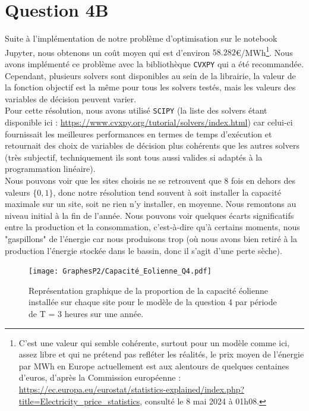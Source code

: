 \documentclass{article}
\begin{document}
\section*{Question 4B}
Suite à l'implémentation de notre problème d'optimisation sur le notebook Jupyter, nous obtenons 
un coût moyen qui est d'environ $\mathbf{58.282}$\euro/MWh\footnote{C'est une valeur qui semble cohérente, surtout pour un modèle comme ici, 
assez libre et qui ne prétend pas refléter les réalités, le prix moyen de l'énergie par MWh en Europe actuellement 
est aux alentours de quelques centaines d'euros, d'après la Commission européenne : 
\url{https://ec.europa.eu/eurostat/statistics-explained/index.php?title=Electricity_price_statistics}, 
consulté le 8 mai 2024 à 01h08.}.
Nous avons implémenté ce problème avec la bibliothèque \verb|CVXPY| qui a été recommandée. Cependant, plusieurs solvers sont disponibles au sein de la librairie, la valeur de la fonction objectif est la même pour tous les solvers testés, mais les valeurs des variables de décision peuvent varier.\\
Pour cette résolution, nous avons utilisé \verb|SCIPY| (la liste des solvers étant disponible ici : \url{https://www.cvxpy.org/tutorial/solvers/index.html})
car celui-ci fournissait les meilleures performances en termes de temps d'exécution et retournait des choix de variables de décision plus cohérents que les autres solvers 
(très subjectif, techniquement ils sont tous aussi valides si adaptés à la programmation linéaire). \\
Nous pouvons voir que les sites choisis ne se retrouvent que 8 fois en dehors des valeurs $\{0,1\}$, donc notre résolution
tend souvent à soit installer la capacité maximale sur un site, soit ne rien n'y installer, en moyenne.
Nous remontons au niveau initial à la fin de l'année. Nous pouvons voir quelques écarts significatifs entre la production et la consommation, c'est-à-dire 
qu'à certains moments, nous "gaspillons" de l'énergie car nous produisons trop (où nous avons bien retiré à la production l'énergie stockée dans le bassin, donc il s'agit d'une perte sèche).

\begin{figure}[h!]
    \centering
    \texttt{[image: GraphesP2/Capacité\_Eolienne\_Q4.pdf]}
    \caption{Représentation graphique de la proportion de la capacité éolienne installée sur chaque site pour le modèle de la question 4 par période
    de T = 3 heures sur une année.}
    \label{fig:Capacité_Eolienne_Q4}
\end{figure}
\end{document}
